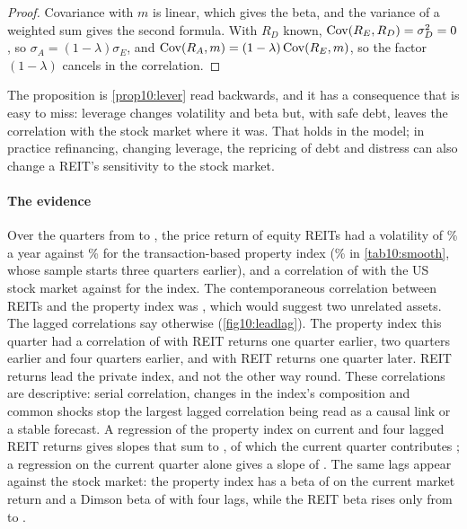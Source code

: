 \begin{chapterrefs}
\begin{proof}
Covariance with $m$ is linear, which gives the beta, and the variance of a weighted sum gives the second
formula. With $R_D$ known, $\operatorname{Cov}(R_E,R_D)=\sigma_D^2=0$, so $\sigma_A=(1-\lambda)\sigma_E$, and
$\operatorname{Cov}(R_A,m)=(1-\lambda)\operatorname{Cov}(R_E,m)$, so the factor $(1-\lambda)$ cancels in the correlation.
\end{proof}

The proposition is \cref{prop10:lever} read backwards, and it has a consequence that is easy to miss:
leverage changes volatility and beta but, with safe debt, leaves the correlation with the stock market
where it was. That holds in the model; in practice refinancing, changing leverage, the repricing of debt and distress can also
change a REIT's sensitivity to the stock market.

\paragraph{The evidence}
Over the \rtN{} quarters from \rtFirst{} to \rtLast, the price return of equity REITs had a volatility of
\rtVolReit\% a year against \rtVolCre\% for the transaction-based property index (\smVolPost\% in
\cref{tab10:smooth}, whose sample starts three quarters earlier), and a correlation of
\rtCorrReitMkt{} with the US stock market against \rtCorrCreMkt{} for the index. The contemporaneous
correlation between REITs and the property index was \rtCorrCreReit, which would suggest two unrelated
assets. The lagged correlations say otherwise (\cref{fig10:leadlag}). The property index this quarter
had a correlation of \rtLeadOne{} with REIT returns one quarter earlier, \rtLeadTwo{} two quarters earlier
and \rtLeadFour{} four quarters earlier, and \rtLagOne{} with REIT returns one quarter later. REIT returns lead
the private index, and not the other way round. These correlations are descriptive: serial correlation,
changes in the index's composition and common shocks stop the largest lagged correlation being read as
a causal link or a stable forecast. A regression of the property index on current and four
lagged REIT returns gives slopes that sum to \rtSumReit, of which the current quarter contributes \rtBzeroReit; a regression on the current quarter alone gives a slope of \rtBuniReit.
The same lags appear against the stock market: the property index has a beta of \rtBetaCre{} on the current
market return and a Dimson beta of \rtBetaCreDim{} with four lags, while the REIT beta rises only from
\rtBetaReit{} to \rtBetaReitDim.


\end{chapterrefs}
